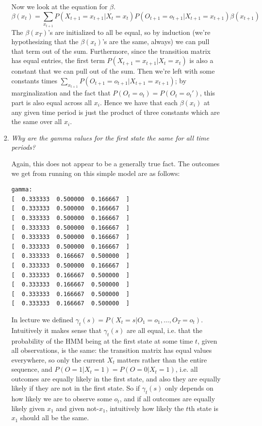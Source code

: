 \documentclass{article}
\begin{document}
\begin{enumerate}[(a)]
\begin{enumerate}
\begin{enumerate}[(1)]
    Now we look at the equation for $\beta$. 
    $$\beta(x_t)=\sum_{x_{t+1}} P(X_{t+1}=x_{t+1}|X_t=x_t)P(O_{t+1}=o_{t+1}|X_{t+1}=x_{t+1})\beta (x_{t+1})$$
    The $\beta(x_T)$'s are initialized to all be equal, so by induction (we're
    hypothesizing that the $\beta(x_t)$'s are the same, always) we can pull that
    term out of the sum. Furthermore, since the transition matrix has equal
    entries, the first term $P(X_{t+1}=x_{t+1}|X_t=x_t)$ is also a constant
    that we can pull out of the sum. Then we're left with some constants times
    $\sum_{x_{t+1}} P(O_{t+1}=o_{t+1}|X_{t+1}=x_{t+1})$; by marginalization
    and the fact that $P(O_t=o_t)=P(O_t=o_t')$, this part is also equal across
    all $x_i$. Hence we have that each $\beta(x_i)$ at any given time period
    is just the product of three constants which are the same over all $x_i$.
    
    
    \item \emph{Why are the gamma values for the first state the same for all time periods?}

    Again, this does not appear to be a generally true fact. The outcomes
    we get from running on this simple model are as follows:

\begin{verbatim}
gamma:
[  0.333333  0.500000  0.166667  ]
[  0.333333  0.500000  0.166667  ]
[  0.333333  0.500000  0.166667  ]
[  0.333333  0.500000  0.166667  ]
[  0.333333  0.500000  0.166667  ]
[  0.333333  0.500000  0.166667  ]
[  0.333333  0.166667  0.500000  ]
[  0.333333  0.500000  0.166667  ]
[  0.333333  0.166667  0.500000  ]
[  0.333333  0.166667  0.500000  ]
[  0.333333  0.166667  0.500000  ]
[  0.333333  0.166667  0.500000  ]
\end{verbatim}

    In lecture we defined $\gamma_t(s)=P(X_t=s|O_1=o_1,\ldots,O_T=o_t)$. 
    Intuitively it makes sense that $\gamma_t(s)$ are all equal, i.e. that
    the probability of the HMM being at the first state at some time $t$,
    given all observations, is the same: the transition matrix has equal 
    values everywhere, so only the current $X_t$ matters rather than the
    entire sequence, and $P(O=1|X_t=1)=P(O=0|X_t=1)$, i.e. all outcomes
    are equally likely in the first state, and also they are equally likely
    if they are not in the first state. So if $\gamma_t(s)$ only depends
    on how likely we are to observe some $o_t$, and if all outcomes are
    equally likely given $x_1$ and given not-$x_1$, intuitively how likely 
    the $t$th state is $x_1$ should all be the same. 


\end{enumerate}
\end{enumerate}
\end{enumerate}
\end{document}
